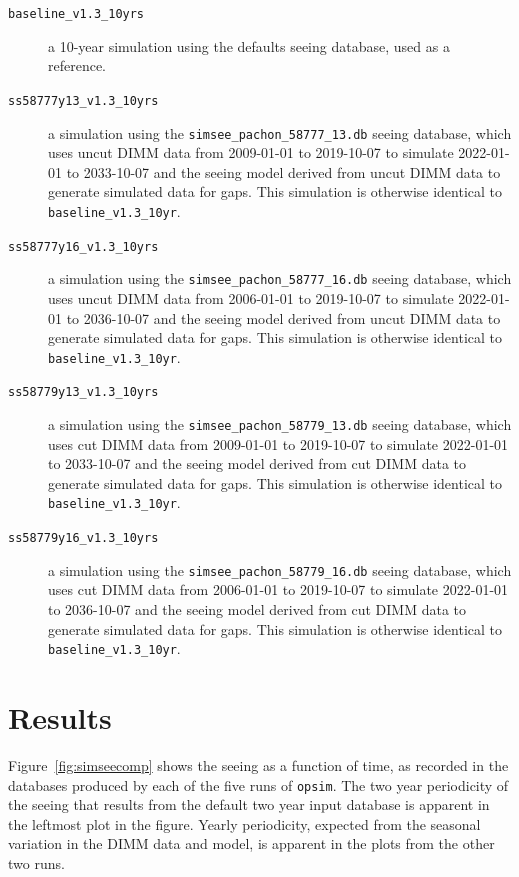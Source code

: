 \documentclass[\docopts]{\docclass}
\begin{document}
\begin{description}
  \item[\texttt{baseline\_v1.3\_10yrs}] a 10-year simulation using the defaults
    seeing database, used as a reference.
  \item[\texttt{ss58777y13\_v1.3\_10yrs}] a simulation using the
    \texttt{simsee\_pachon\_58777\_13.db} seeing database, which uses
    uncut DIMM data from 2009-01-01 to 2019-10-07 to simulate
    2022-01-01 to 2033-10-07 and the seeing model derived from uncut
    DIMM data to generate simulated data for gaps. This simulation is otherwise identical
    to \texttt{baseline\_v1.3\_10yr}.
  \item[\texttt{ss58777y16\_v1.3\_10yrs}] a simulation using the
    \texttt{simsee\_pachon\_58777\_16.db} seeing database, which uses
    uncut DIMM data from 2006-01-01 to 2019-10-07 to simulate
    2022-01-01 to 2036-10-07 and the seeing model derived from uncut
    DIMM data to generate simulated data for gaps. This simulation is otherwise identical
    to \texttt{baseline\_v1.3\_10yr}.
  \item[\texttt{ss58779y13\_v1.3\_10yrs}] a simulation using the
    \texttt{simsee\_pachon\_58779\_13.db} seeing database, which uses
    cut DIMM data from 2009-01-01 to 2019-10-07 to simulate 2022-01-01
    to 2033-10-07 and the seeing model derived from cut DIMM data to
    generate simulated data for gaps. This simulation is otherwise
    identical to \texttt{baseline\_v1.3\_10yr}.
  \item[\texttt{ss58779y16\_v1.3\_10yrs}] a simulation using the
    \texttt{simsee\_pachon\_58779\_16.db} seeing database, which uses
    cut DIMM data from 2006-01-01 to 2019-10-07 to simulate 2022-01-01
    to 2036-10-07 and the seeing model derived from cut DIMM data to
    generate simulated data for gaps. This simulation is otherwise
    identical to \texttt{baseline\_v1.3\_10yr}.
\end{description}


\section{Results}
\label{sec:results}

Figure~\ref{fig:simseecomp} shows the seeing as a function of time, as
recorded in the databases produced by each of the five runs of
\texttt{opsim}. The two year periodicity of the seeing that results
from the default two year input database is apparent in the leftmost
plot in the figure. Yearly periodicity, expected from the seasonal
variation in the DIMM data and model, is apparent in the plots from
the other two runs. 
\end{document}
